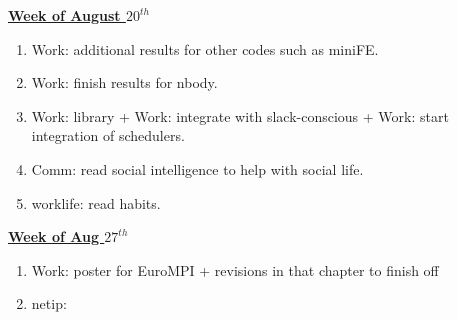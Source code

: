 \documentclass[serif, mathserif, final]{beamer}
\begin{document}
\begin{frame}{}
\begin{columns}
\begin{column}{0.27\linewidth}
\begin{block} {\small \underline{\textbf{Week of August $20^{th}$}} }
\begin{enumerate}
\tiny \item \tiny Work: additional results for other codes such as miniFE. 
\tiny \item \tiny Work: finish results for nbody. 
\item \tiny Work: library +  Work: integrate with slack-conscious +  Work: start integration of schedulers.
\item \tiny Comm: read social intelligence to help with social life.
\item \tiny worklife: read habits.
\end{enumerate}
\end{block}

\begin{block}{ \small \underline{\textbf{Week of Aug $27^{th}$ }}}
\begin{enumerate}
\tiny \item \tiny Work: poster for EuroMPI + revisions in that chapter to finish off
 \item \tiny netip:
\end{enumerate}
\end{block} 

\end{column}%

\end{columns} 

\end{frame} 
\end{document}
